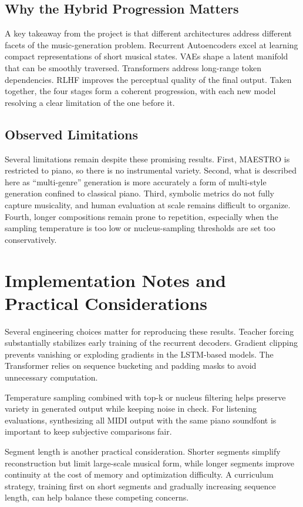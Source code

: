 \documentclass[conference]{IEEEtran}
\begin{document}
\subsection{Why the Hybrid Progression Matters}
A key takeaway from the project is that different architectures address different facets of the music-generation problem. Recurrent Autoencoders excel at learning compact representations of short musical states. VAEs shape a latent manifold that can be smoothly traversed. Transformers address long-range token dependencies. RLHF improves the perceptual quality of the final output. Taken together, the four stages form a coherent progression, with each new model resolving a clear limitation of the one before it.

\subsection{Observed Limitations}
Several limitations remain despite these promising results. First, MAESTRO is restricted to piano, so there is no instrumental variety. Second, what is described here as ``multi-genre'' generation is more accurately a form of multi-style generation confined to classical piano. Third, symbolic metrics do not fully capture musicality, and human evaluation at scale remains difficult to organize. Fourth, longer compositions remain prone to repetition, especially when the sampling temperature is too low or nucleus-sampling thresholds are set too conservatively.

\section{Implementation Notes and Practical Considerations}
Several engineering choices matter for reproducing these results. Teacher forcing substantially stabilizes early training of the recurrent decoders. Gradient clipping prevents vanishing or exploding gradients in the LSTM-based models. The Transformer relies on sequence bucketing and padding masks to avoid unnecessary computation.

Temperature sampling combined with top-k or nucleus filtering helps preserve variety in generated output while keeping noise in check. For listening evaluations, synthesizing all MIDI output with the same piano soundfont is important to keep subjective comparisons fair.

Segment length is another practical consideration. Shorter segments simplify reconstruction but limit large-scale musical form, while longer segments improve continuity at the cost of memory and optimization difficulty. A curriculum strategy, training first on short segments and gradually increasing sequence length, can help balance these competing concerns.
\end{document}
